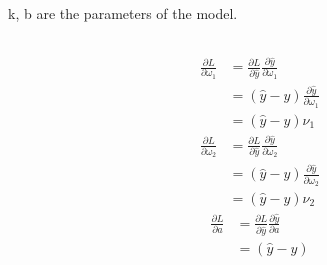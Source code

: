 \documentclass[11pt]{scrartcl} %
\begin{document}
\section{} %
\subsection{} %
k, b are the parameters of the model.
\subsection{} %
\begin{equation}
\begin{aligned}
	\frac{\partial L}{\partial \omega_1} &= \frac{\partial L}{\partial \hat{y}} \frac{\partial \hat{y}}{\partial \omega_1} \\
	&= (\hat{y} - y) \frac{\partial \hat{y}}{\partial \omega_1} \\
	&= (\hat{y} - y) \nu_1 
\end{aligned}
\end{equation}
\begin{equation}
\begin{aligned}
	\frac{\partial L}{\partial \omega_2} &= \frac{\partial L}{\partial \hat{y}} \frac{\partial \hat{y}}{\partial \omega_2} \\
	&= (\hat{y} - y) \frac{\partial \hat{y}}{\partial \omega_2} \\
	&= (\hat{y} - y) \nu_2
\end{aligned}
\end{equation}
\begin{equation}
	\begin{aligned}
		\frac{\partial L}{\partial a} &= \frac{\partial L}{\partial \hat{y}} \frac{\partial \hat{y}}{\partial a} \\
		&= (\hat{y} - y)
	\end{aligned}
\end{equation}
\end{document}

